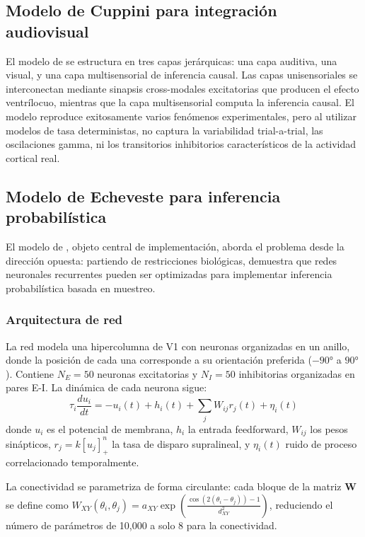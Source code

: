 \documentclass[spanish,a4paper,11pt]{article}
\begin{document}
\subsection{Modelo de Cuppini para integración audiovisual}

El modelo de \citet{cuppini2017biologically} se estructura en tres capas jerárquicas: una capa auditiva, una visual, y una capa multisensorial de inferencia causal. Las capas unisensoriales se interconectan mediante sinapsis cross-modales excitatorias que producen el efecto ventrílocuo, mientras que la capa multisensorial computa la inferencia causal. El modelo reproduce exitosamente varios fenómenos experimentales, pero al utilizar modelos de tasa deterministas, no captura la variabilidad trial-a-trial, las oscilaciones gamma, ni los transitorios inhibitorios característicos de la actividad cortical real.

\subsection{Modelo de Echeveste para inferencia probabilística}

El modelo de \citet{echeveste2020cortical}, objeto central de implementación, aborda el problema desde la dirección opuesta: partiendo de restricciones biológicas, demuestra que redes neuronales recurrentes pueden ser optimizadas para implementar inferencia probabilística basada en muestreo.

\subsubsection{Arquitectura de red}

La red modela una hipercolumna de V1 con neuronas organizadas en un anillo, donde la posición de cada una corresponde a su orientación preferida ($-90°$ a $90°$). Contiene $N_E = 50$ neuronas excitatorias y $N_I = 50$ inhibitorias organizadas en pares E-I. La dinámica de cada neurona sigue:
\begin{equation}
\tau_i \frac{du_i}{dt} = -u_i(t) + h_i(t) + \sum_j W_{ij} r_j(t) + \eta_i(t)
\label{eq:ssn}
\end{equation}
donde $u_i$ es el potencial de membrana, $h_i$ la entrada feedforward, $W_{ij}$ los pesos sinápticos, $r_j = k[u_j]_+^n$ la tasa de disparo supralineal, y $\eta_i(t)$ ruido de proceso correlacionado temporalmente.

La conectividad se parametriza de forma circulante: cada bloque de la matriz $\mathbf{W}$ se define como $W_{XY}(\theta_i, \theta_j) = a_{XY} \exp\left(\frac{\cos(2(\theta_i - \theta_j)) - 1}{d_{XY}^2}\right)$, reduciendo el número de parámetros de 10,000 a solo 8 para la conectividad.
\end{document}
